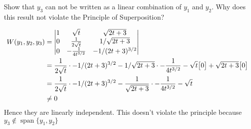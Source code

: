 Show that $y_3$ can not be written as a linear combination of $y_1$ and $y_2$. Why does this result not violate the Principle of Superposition?


\begin{align*}
    W(y_1, y_2, y_3) &= {\begin{vmatrix}
        1 & \sqrt{t} & \sqrt{2t+3} \\
        0 & \over{2\sqrt{t}}& 1/\sqrt{2t+3}\\
        0 & -\frac{1}{4t^{3/2}} & -1/(2t+3)^{3/2}
    \end{vmatrix}}\\
    &= \over{2\sqrt{t}} \cdot -1/(2t+3)^{3/2} - 1/\sqrt{2t+3} \cdot -\frac{1}{4t^{3/2}} - \sqrt{t} \bigbrac{0} + \sqrt{2t+3}\bigbrac{0}\\
    &= \over{2\sqrt{t}} \cdot -1/(2t+3)^{3/2} - \over{\sqrt{2t+3}} \cdot -\frac{1}{4t^{3/2}} - \sqrt{t}
    \\ &\neq 0
\end{align*}
Hence they are linearly independent. This doesn't violate the principle because $y_3 \not \in \operatorname{span}\{y_1, y_2\}$